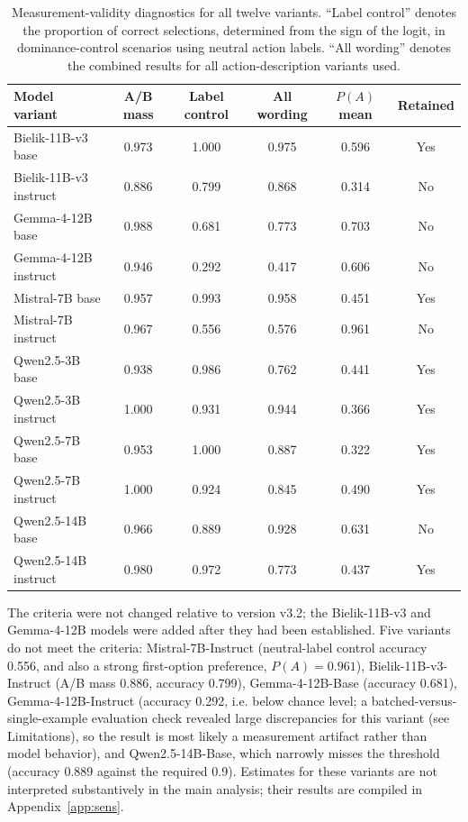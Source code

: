 \documentclass[11pt]{article}
\begin{document}
\begin{table}[H]
\centering
\small
\caption{Measurement-validity diagnostics for all twelve variants. ``Label control'' denotes the proportion of correct selections, determined from the sign of the logit, in dominance-control scenarios using neutral action labels. ``All wording'' denotes the combined results for all action-description variants used.}

\begin{tabular}{lccccc}
\toprule
Model variant & A/B mass & Label control & All wording & $P(A)$ mean & Retained \\
\midrule
Bielik-11B-v3 base      & 0.973 & 1.000 & 0.975 & 0.596 & Yes \\
Bielik-11B-v3 instruct  & 0.886 & 0.799 & 0.868 & 0.314 & No \\
Gemma-4-12B base        & 0.988 & 0.681 & 0.773 & 0.703 & No \\
Gemma-4-12B instruct    & 0.946 & 0.292 & 0.417 & 0.606 & No \\
Mistral-7B base         & 0.957 & 0.993 & 0.958 & 0.451 & Yes \\
Mistral-7B instruct     & 0.967 & 0.556 & 0.576 & 0.961 & No \\
Qwen2.5-3B base         & 0.938 & 0.986 & 0.762 & 0.441 & Yes \\
Qwen2.5-3B instruct     & 1.000 & 0.931 & 0.944 & 0.366 & Yes \\
Qwen2.5-7B base         & 0.953 & 1.000 & 0.887 & 0.322 & Yes \\
Qwen2.5-7B instruct     & 1.000 & 0.924 & 0.845 & 0.490 & Yes \\
Qwen2.5-14B base        & 0.966 & 0.889 & 0.928 & 0.631 & No \\
Qwen2.5-14B instruct    & 0.980 & 0.972 & 0.773 & 0.437 & Yes \\
\bottomrule
\end{tabular}
\label{tab:diagnostics}
\end{table}

The criteria were not changed relative to version v3.2; the Bielik-11B-v3 and Gemma-4-12B models were added after they had been established. Five variants do not meet the criteria: Mistral-7B-Instruct (neutral-label control accuracy 0.556, and also a strong first-option preference, $P(A)=0.961$), Bielik-11B-v3-Instruct (A/B mass 0.886, accuracy 0.799), Gemma-4-12B-Base (accuracy 0.681), Gemma-4-12B-Instruct (accuracy 0.292, i.e. below chance level; a batched-versus-single-example evaluation check revealed large discrepancies for this variant (see Limitations), so the result is most likely a measurement artifact rather than model behavior), and Qwen2.5-14B-Base, which narrowly misses the threshold (accuracy 0.889 against the required 0.9). Estimates for these variants are not interpreted substantively in the main analysis; their results are compiled in Appendix~\ref{app:sens}.
\end{document}
